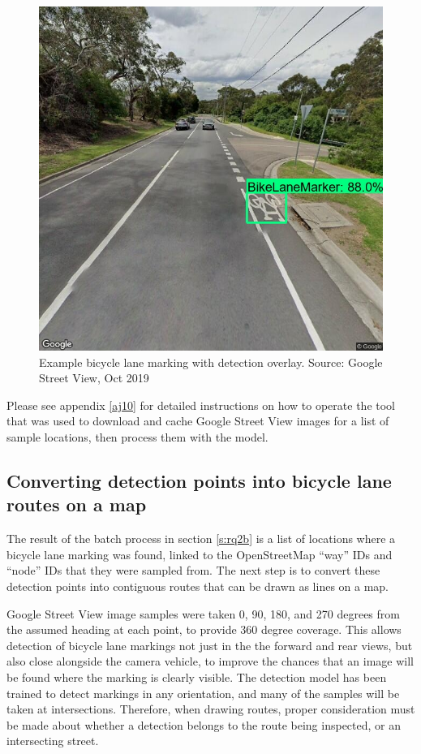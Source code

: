 \documentclass[11pt,twoside]{report}
\begin{document}
\begin{figure}[h!]
\centering
\includegraphics[width=0.5\linewidth]{f004_gsv_detection_example.jpg}
\caption{Example bicycle lane marking with detection overlay.  Source: Google Street View, Oct 2019}
\label{fig:004}
\end{figure}

Please see appendix \ref{aj10} for detailed instructions on how to operate the tool that was used to download and cache Google Street View images for a list of sample locations, then process them with the model.


\subsection{Converting detection points into bicycle lane routes on a map}
\label{s:rq2c}

The result of the batch process in section \ref{s:rq2b} is a list of locations where a bicycle lane marking was found, linked to the OpenStreetMap ``way'' IDs and ``node'' IDs that they were sampled from.  The next step is to convert these detection points into contiguous routes that can be drawn as lines on a map.

Google Street View image samples were taken 0, 90, 180, and 270 degrees from the assumed heading at each point, to provide 360 degree coverage.  This allows detection of bicycle lane markings not just in the the forward and rear views, but also close alongside the camera vehicle, to improve the chances that an image will be found where the marking is clearly visible.  The detection model has been trained to detect markings in any orientation, and many of the samples will be taken at intersections.  Therefore, when drawing routes, proper consideration must be made about whether a detection belongs to the route being inspected, or an intersecting street.
\end{document}

